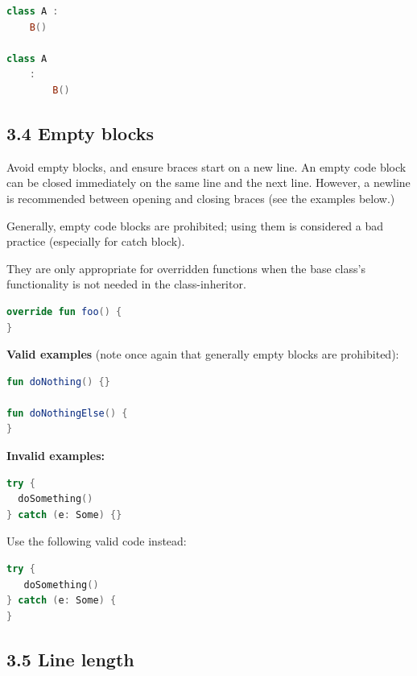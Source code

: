 {{{{{{{{{{{{{{{{\begin{lstlisting}[language=Kotlin]
class A :
    B()
    
class A
    :
        B()
\end{lstlisting}


\subsection*{\textbf{3.4 Empty blocks}}

\label{sec:3.4}



Avoid empty blocks, and ensure braces start on a new line. An empty code block can be closed immediately on the same line and the next line. However, a newline is recommended between opening and closing braces \textbf{{}} (see the examples below.)



Generally, empty code blocks are prohibited; using them is considered a bad practice (especially for catch block).

They are only appropriate for overridden functions when the base class's functionality is not needed in the class-inheritor.

\begin{lstlisting}[language=Kotlin]
override fun foo() {    
}
\end{lstlisting}


\textbf{Valid examples} (note once again that generally empty blocks are prohibited):



\begin{lstlisting}[language=Kotlin]
fun doNothing() {} 

fun doNothingElse() {
}
\end{lstlisting}


\textbf{Invalid examples:}

\begin{lstlisting}[language=Kotlin]
try {
  doSomething()
} catch (e: Some) {}
\end{lstlisting}


Use the following valid code instead:

\begin{lstlisting}[language=Kotlin]
try {
   doSomething()
} catch (e: Some) {
}
\end{lstlisting}


\subsection*{\textbf{3.5 Line length}}

}}}}}}}}}}}}}}}}
